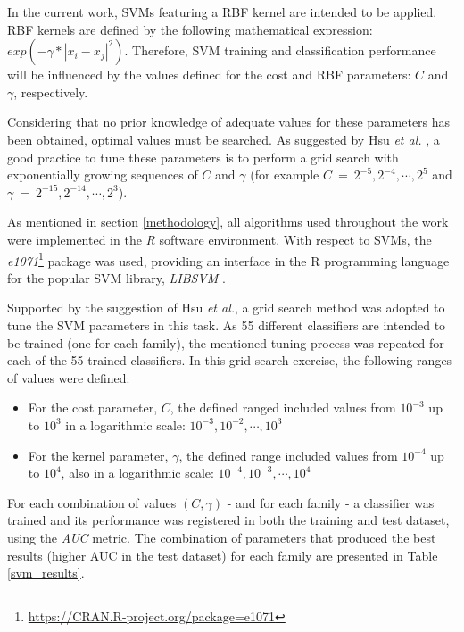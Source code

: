 \documentclass[11pt]{article}
\begin{document}
In the current work, SVMs featuring a RBF kernel are intended to be applied. RBF kernels are defined by the following mathematical expression: $exp(- \gamma * |x_{i}-x_{j}|^2) $. Therefore, SVM training and classification performance will be influenced by the values defined for the cost and RBF parameters: $C$ and $\gamma$, respectively.

Considering that no prior knowledge of adequate values for these parameters has been obtained, optimal values must be searched. As suggested by Hsu \emph{et al.} \cite{hsu2003practical}, a good practice to tune these parameters is to perform a grid search with exponentially growing sequences of $C$ and $\gamma$ (for example $C \: = \: 2^{-5}, 2^{-4}, \cdots , 2^{5}$ and $\gamma \: = \: 2^{-15}, 2^{-14}, \cdots , 2^{3}$).

As mentioned in section \ref{methodology}, all algorithms used throughout the work were implemented in the \emph{R} software environment. With respect to SVMs, the \emph{e1071}\footnote{\url{https://CRAN.R-project.org/package=e1071}} package was used, providing an interface in the R programming language for the popular SVM library, \emph{LIBSVM} \cite{CC01a}.

Supported by the suggestion of Hsu \emph{et al.}, a grid search method was adopted to tune the SVM parameters in this task. As 55 different classifiers are intended to be trained (one for each family), the mentioned tuning process was repeated for each of the 55 trained classifiers. In this grid search exercise, the following ranges of values were defined:

\begin{itemize}
	\item For the cost parameter, $C$, the defined ranged included values from $10^{-3}$ up to $10^{3}$ in a logarithmic scale: $10^{-3}, 10^{-2}, \cdots , 10^{3}$
	
	\item For the kernel parameter, $\gamma$, the defined range included values from $10^{-4}$ up to $10^{4}$, also in a logarithmic scale: $10^{-4}, 10^{-3}, \cdots , 10^{4}$
\end{itemize}

For each combination of values $(C, \gamma)$ - and for each family - a classifier was trained and its performance was registered in both the training and test dataset, using the \emph{AUC} metric. The combination of parameters that produced the best results (higher AUC in the test dataset) for each family are presented in Table \ref{svm_results}.
\end{document}
